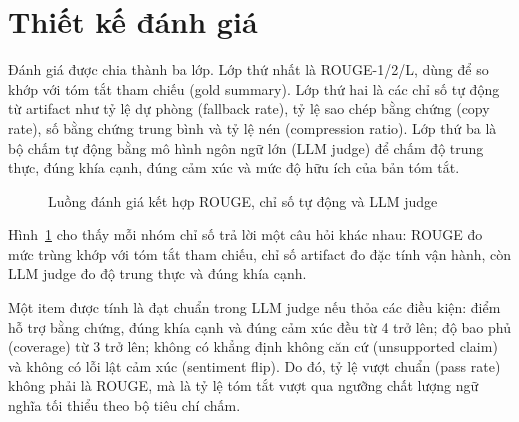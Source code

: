 \documentclass[12pt,a4paper]{report}
\begin{document}
\section{Thiết kế đánh giá}

Đánh giá được chia thành ba lớp. Lớp thứ nhất là ROUGE-1/2/L, dùng để so khớp với tóm tắt tham chiếu (gold summary). Lớp thứ hai là các chỉ số tự động từ artifact như tỷ lệ dự phòng (fallback rate), tỷ lệ sao chép bằng chứng (copy rate), số bằng chứng trung bình và tỷ lệ nén (compression ratio). Lớp thứ ba là bộ chấm tự động bằng mô hình ngôn ngữ lớn (LLM judge) để chấm độ trung thực, đúng khía cạnh, đúng cảm xúc và mức độ hữu ích của bản tóm tắt.

\begin{figure}[tbp]
\centering
{}
\caption{Luồng đánh giá kết hợp ROUGE, chỉ số tự động và LLM judge}
\label{fig:evaluation-flow}
\end{figure}

Hình~\ref{fig:evaluation-flow} cho thấy mỗi nhóm chỉ số trả lời một câu hỏi khác nhau: ROUGE đo mức trùng khớp với tóm tắt tham chiếu, chỉ số artifact đo đặc tính vận hành, còn LLM judge đo độ trung thực và đúng khía cạnh.

Một item được tính là đạt chuẩn trong LLM judge nếu thỏa các điều kiện: điểm hỗ trợ bằng chứng, đúng khía cạnh và đúng cảm xúc đều từ 4 trở lên; độ bao phủ (coverage) từ 3 trở lên; không có khẳng định không căn cứ (unsupported claim) và không có lỗi lật cảm xúc (sentiment flip). Do đó, tỷ lệ vượt chuẩn (pass rate) không phải là ROUGE, mà là tỷ lệ tóm tắt vượt qua ngưỡng chất lượng ngữ nghĩa tối thiểu theo bộ tiêu chí chấm.
\end{document}
